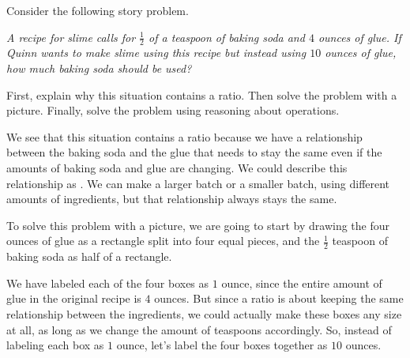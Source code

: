 \documentclass{ximera}
\begin{document}
\begin{example}
Consider the following story problem.

\emph{A recipe for slime calls for $\frac{1}{2}$ of a teaspoon of baking soda and $4$ ounces of glue. If Quinn wants to make slime using this recipe but instead using $10$ ounces of glue, how much baking soda should be used?}

First, explain why this situation contains a ratio. Then solve the problem with a picture. Finally, solve the problem using reasoning about operations.

We see that this situation contains a ratio because we have a relationship between the baking soda and the glue that needs to stay the same even if the amounts of baking soda and glue are changing. We could describe this relationship as . We can make a larger batch or a smaller batch, using different amounts of ingredients, but that relationship always stays the same. 

To solve this problem with a picture, we are going to start by drawing the four ounces of glue as a rectangle split into four equal pieces, and the $\frac{1}{2}$ teaspoon of baking soda as half of a rectangle. 

\begin{image} \end{image}


We have labeled each of the four boxes as $1$ ounce, since the entire amount of glue in the original recipe is $4$ ounces. But since a ratio is about keeping the same relationship between the ingredients, we could actually make these boxes any size at all, as long as we change the amount of teaspoons accordingly. So, instead of labeling each box as $1$ ounce, let's label the four boxes together as $10$ ounces. 

\begin{image} \end{image}


\end{example}
\end{document}
